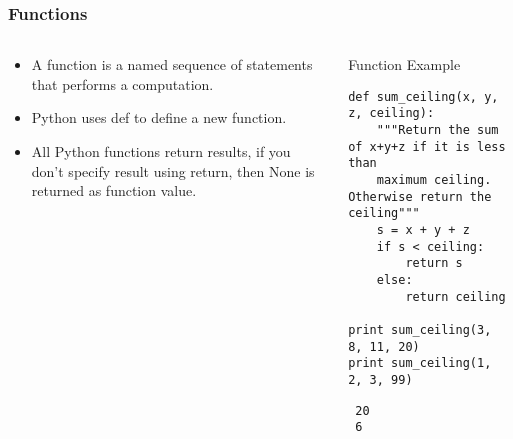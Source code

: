 \documentclass[bigger]{beamer}
\begin{document}
\begin{frame}[fragile]
\frametitle{Functions}
\label{sec-1-4}
\begin{columns}
\begin{column}{0.4\textwidth}
\label{sec-1-4-1}

\begin{itemize}
\item A function is a named sequence of statements that performs a computation.
\item Python uses def to define a new function.
\item All Python functions return results, if you don't specify result using
     return, then None is returned as function value.
\end{itemize}
\end{column}
\begin{column}{0.6\textwidth}
\begin{block}{Function Example}
\label{sec-1-4-2}

\fontsize{6}{7.2}\selectfont

\begin{verbatim}
def sum_ceiling(x, y, z, ceiling):
    """Return the sum of x+y+z if it is less than
    maximum ceiling.  Otherwise return the ceiling"""
    s = x + y + z
    if s < ceiling:
        return s
    else:
        return ceiling

print sum_ceiling(3, 8, 11, 20)
print sum_ceiling(1, 2, 3, 99)
\end{verbatim}

\begin{verbatim}
 20
 6
\end{verbatim}
\end{block}
\end{column}
\end{columns}
\end{frame}
\end{document}
